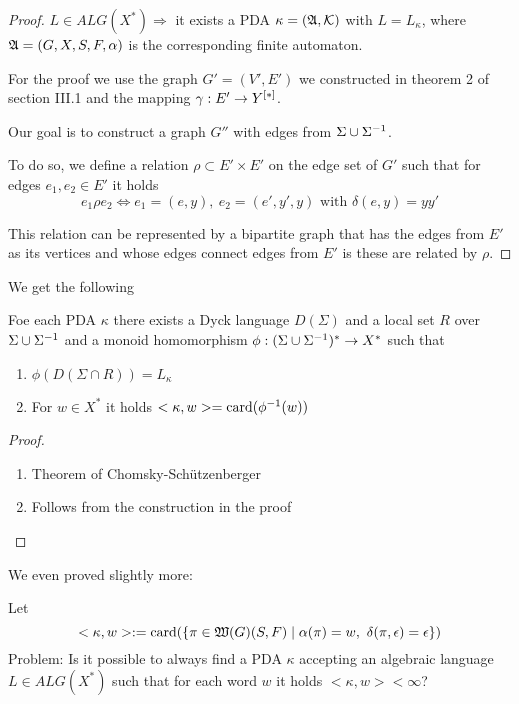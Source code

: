 \begin{proof}
$L\in ALG(X^*) \Rightarrow$ it exists a PDA $\kappa=(\mbox{$\mathfrak{A}$},\mbox{$\mathcal{K}$})$ with
$L = L_\kappa$, where $\mbox{$\mathfrak{A}$}=(G, X, S, F, \alpha)$ is the corresponding finite
automaton.

For the proof we use the graph $G'=(V',E')$ we constructed in theorem 2 of
section III.1 and the mapping $\gamma: E' \to \mbox{${Y}^{[*]}$}$.

Our goal is to construct a graph $G''$ with edges from $\Sigma \cup {\Sigma}^{-1}$.

To do so, we define a relation $\rho \subset E'\times E'$ on the edge set of
$G'$ such that for edges $e_1, e_2\in E'$ it holds
\[ e_1 \rho e_2 \iff e_1 = (e, y),\ e_2 = (e', y', y)\text{ with }\delta(e, y) =
yy' \]

This relation can be represented by a bipartite graph that has the edges from
$E'$ as its vertices and whose edges connect edges from $E'$ is these are
related by $\rho$.

\end{proof}

We get the following
\begin{corollary}
Foe each PDA $\kappa$ there exists a Dyck language $D(\Sigma)$ and a local set
$R$ over $\Sigma \cup {\Sigma}^{-1}$ and a monoid homomorphism $\phi:
(\Sigma \cup {\Sigma}^{-1})^* \to X^*$ such that
\begin{enumerate}
  \item $\phi(D(\Sigma\cap R)) = L_\kappa$
  \item For $w\in X^*$ it holds $<\kappa, w> = \mathrm{card}(\phi^{-1}(w))$
\end{enumerate}
\end{corollary}

\begin{proof}
\begin{enumerate}
  \item Theorem of Chomsky-Schützenberger
  \item Follows from the construction in the proof
\end{enumerate}
\end{proof}

We even proved slightly more:

Let \[ <\kappa, w> := \mathrm{card}(\mbox{$\{\pi\in\mbox{$\mathfrak{W}(G)$}(S,F)\mid
\alpha(\pi)=w,\ \delta(\pi,\epsilon)=\epsilon\}$})
\]
Problem: Is it possible to always find a PDA $\kappa$ accepting an algebraic
language $L \in ALG(X^*)$ such that for each word $w$ it holds $<\kappa, w> <
\infty$?

